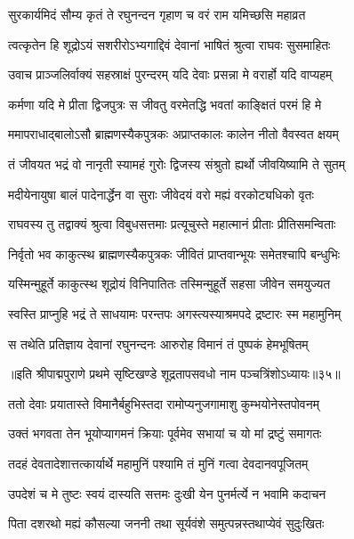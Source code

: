 \twolineshloka
{सुरकार्यमिदं सौम्य कृतं ते रघुनन्दन}
{गृहाण च वरं राम यमिच्छसि महाव्रत}%

\twolineshloka
{त्वत्कृतेन हि शूद्रोऽयं सशरीरोऽभ्यगाद्दिवं}
{देवानां भाषितं श्रुत्वा राघवः सुसमाहितः}%

\twolineshloka
{उवाच प्राञ्जलिर्वाक्यं सहस्राक्षं पुरन्दरम्}
{यदि देवाः प्रसन्ना मे वरार्हो यदि वाप्यहम्}%

\twolineshloka
{कर्मणा यदि मे प्रीता द्विजपुत्रः स जीवतु}
{वरमेतद्धि भवतां काङ्क्षितं परमं हि मे}%

\twolineshloka
{ममापराधाद्बालोऽसौ ब्राह्मणस्यैकपुत्रकः}
{अप्राप्तकालः कालेन नीतो वैवस्वत क्षयम्}%

\twolineshloka
{तं जीवयत भद्रं वो नानृती स्यामहं गुरोः}
{द्विजस्य संश्रुतो ह्यर्थो जीवयिष्यामि ते सुतम्}%

\twolineshloka
{मदीयेनायुषा बालं पादेनार्द्धेन वा सुराः}
{जीवेदयं वरो मह्यं वरकोट्यधिको वृतः}%

\twolineshloka
{राघवस्य तु तद्वाक्यं श्रुत्वा विबुधसत्तमाः}
{प्रत्यूचुस्ते महात्मानं प्रीताः प्रीतिसमन्विताः}%

\twolineshloka
{निर्वृतो भव काकुत्स्थ ब्राह्मणस्यैकपुत्रकः}
{जीवितं प्राप्तवान्भूयः समेतश्चापि बन्धुभिः}%

\twolineshloka
{यस्मिन्मुहूर्ते काकुत्स्थ शूद्रोयं विनिपातितः}
{तस्मिन्मुहूर्ते सहसा जीवेन समयुज्यत}%

\twolineshloka
{स्वस्ति प्राप्नुहि भद्रं ते साधयामः परन्तपः}
{अगस्त्यस्याश्रमपदे द्रष्टारः स्म महामुनिम्}%

\twolineshloka
{स तथेति प्रतिज्ञाय देवानां रघुनन्दनः}
{आरुरोह विमानं तं पुष्पकं हेमभूषितम्}%

{॥इति श्रीपाद्मपुराणे प्रथमे सृष्टिखण्डे शूद्रतापसवधो नाम पञ्चत्रिंशोऽध्यायः॥३५॥}



\twolineshloka
{ततो देवाः प्रयातास्ते विमानैर्बहुभिस्तदा}
{रामोप्यनुजगामाशु कुम्भयोनेस्तपोवनम्}%

\twolineshloka
{उक्तं भगवता तेन भूयोप्यागमनं क्रियाः}
{पूर्वमेव सभायां च यो मां द्रष्टुं समागतः}%

\twolineshloka
{तदहं देवतादेशात्तत्कार्यार्थे महामुनिं}
{पश्यामि तं मुनिं गत्वा देवदानवपूजितम्}%

\twolineshloka
{उपदेशं च मे तुष्टः स्वयं दास्यति सत्तमः}
{दुःखी येन पुनर्मर्त्ये न भवामि कदाचन}%

\twolineshloka
{पिता दशरथो मह्यं कौसल्या जननी तथा}
{सूर्यवंशे समुत्पन्नस्तथाप्येवं सुदुःखितः}%

